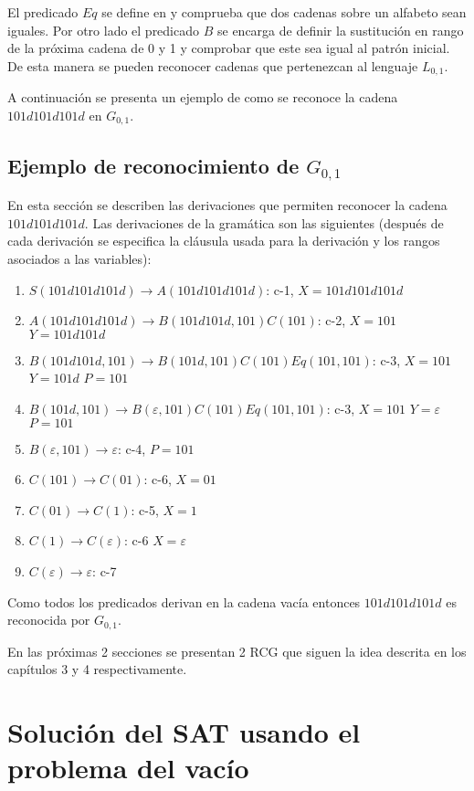 El predicado $Eq$ se define en \cite{mainRCGBib} y comprueba que dos cadenas sobre un alfabeto sean iguales.
Por otro lado el predicado $B$ se encarga de definir la sustitución en rango de la próxima cadena de 0 y 1 y
comprobar que este sea igual al patrón inicial. De esta manera se pueden reconocer cadenas que pertenezcan al lenguaje $L_{0,1}$.

A continuación se presenta un ejemplo de como se reconoce la cadena $101d101d101d$ en $G_{0,1}$.

\subsection{Ejemplo de reconocimiento de $G_{0,1}$}

En esta sección se describen las derivaciones que permiten reconocer la cadena $101d101d101d$. Las derivaciones
de la gramática son las siguientes (después de cada derivación se especifica la cláusula
usada para la derivación y los rangos asociados a las variables):

\begin{enumerate}
    \item $S(101d101d101d) \to A(101d101d101d)$: c-1, $X=101d101d101d$
    \item $A(101d101d101d) \to B(101d101d,101)C(101)$: c-2, $X=101$ $Y=101d101d$
    \item $B(101d101d,101) \to B(101d,101)C(101)Eq(101,101)$: c-3, $X=101$ $Y=101d$ $P=101$
    \item $B(101d,101) \to B(\varepsilon,101)C(101)Eq(101,101)$: c-3, $X=101$ $Y=\varepsilon$ $P=101$
    \item $B(\varepsilon,101) \to \varepsilon$: c-4, $P=101$
    \item $C(101)\to C(01)$: c-6, $X=01$
    \item $C(01)\to C(1)$: c-5, $X=1$
    \item $C(1)\to C(\varepsilon)$: c-6 $X=\varepsilon$
    \item $C(\varepsilon)\to \varepsilon$: c-7
\end{enumerate}

Como todos los predicados derivan en la cadena vacía entonces $101d101d101d$ es reconocida por $G_{0,1}$.

En las próximas 2 secciones se presentan 2 RCG que siguen la idea descrita en los capítulos 3 y 4 respectivamente.

\section{Solución del SAT usando el problema del vacío}

